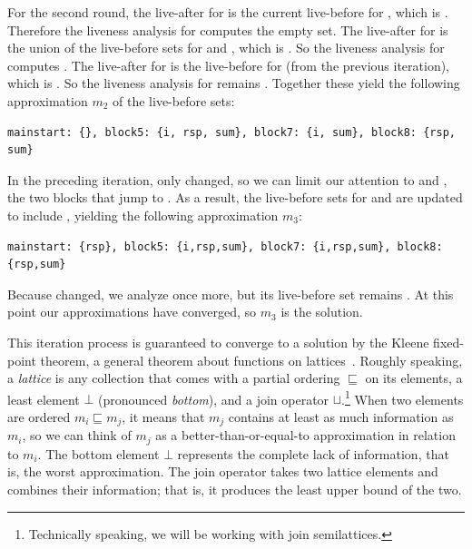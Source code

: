 \documentclass[7x10]{TimesAPriori_MIT}%
\numberwithin{theorem}{chapter}
\numberwithin{definition}{chapter}
\numberwithin{equation}{chapter}
\begin{document}
For the second round, the live-after for  is the
current live-before for , which is .  Therefore
the liveness analysis for  computes the empty set. The
live-after for  is the union of the live-before sets for
 and , which is .
So the liveness analysis for  computes .  The live-after for  is the live-before for
 (from the previous iteration), which is .
So the liveness analysis for  remains .  Together these yield the following approximation $m_2$ of
the live-before sets:
\begin{center}
  \begin{lstlisting}
mainstart: {}, block5: {i, rsp, sum}, block7: {i, sum}, block8: {rsp, sum}
\end{lstlisting}
\end{center}
In the preceding iteration, only  changed, so we can
limit our attention to  and , the two
blocks that jump to .  As a result, the live-before sets
for  and  are updated to include
, yielding the following approximation $m_3$:
\begin{center}
  \begin{lstlisting}
mainstart: {rsp}, block5: {i,rsp,sum}, block7: {i,rsp,sum}, block8: {rsp,sum}
\end{lstlisting}
\end{center}
Because  changed, we analyze  once more, but
its live-before set remains .  At this point
our approximations have converged, so $m_3$ is the solution.

This iteration process is guaranteed to converge to a solution by the
Kleene fixed-point theorem, a general theorem about functions on
lattices~\citep{Kleene:1952aa}. Roughly speaking, a \emph{lattice} is
any collection that comes with a partial ordering $\sqsubseteq$ on its
elements, a least element $\bot$ (pronounced \emph{bottom}), and a
join operator
$\sqcup$.\footnote{Technically speaking, we
  will be working with join semilattices.} When two elements are
ordered $m_i \sqsubseteq m_j$, it means that $m_j$ contains at least
as much information as $m_i$, so we can think of $m_j$ as a
better-than-or-equal-to approximation in relation to $m_i$.  The
bottom element $\bot$ represents the complete lack of information,
that is, the worst approximation.  The join operator takes two lattice
elements and combines their information; that is, it produces the
least upper bound of the two.
\end{document}
